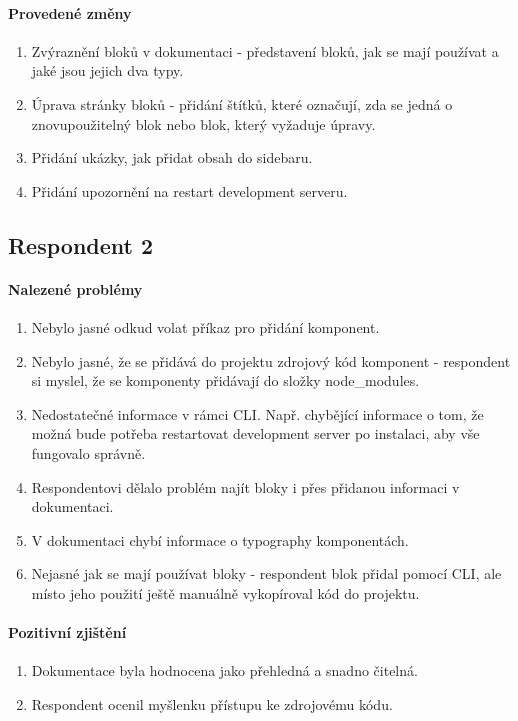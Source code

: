 \paragraph{Provedené změny}
\begin{enumerate}
  \item Zvýraznění bloků v dokumentaci - představení bloků, jak se mají používat a jaké jsou jejich dva typy.
  \item Úprava stránky bloků - přidání štítků, které označují, zda se jedná o znovupoužitelný blok nebo blok, který vyžaduje úpravy.
  \item Přidání ukázky, jak přidat obsah do sidebaru.
  \item Přidání upozornění na restart development serveru.
\end{enumerate}


\subsection{Respondent 2}

\paragraph{Nalezené problémy}
\begin{enumerate}
  \item Nebylo jasné odkud volat příkaz pro přidání komponent.
  \item Nebylo jasné, že se přidává do projektu zdrojový kód komponent - respondent si myslel, že se komponenty přidávají do složky node\_modules.
  \item Nedostatečné informace v rámci CLI. Např. chybějící informace o tom, že možná bude potřeba restartovat development server po instalaci, aby vše fungovalo správně.
  \item Respondentovi dělalo problém najít bloky i přes přidanou informaci v dokumentaci.
  \item V dokumentaci chybí informace o typography komponentách.
  \item Nejasné jak se mají používat bloky - respondent blok přidal pomocí CLI, ale místo jeho použití ještě manuálně vykopíroval kód do projektu.
\end{enumerate}

\paragraph{Pozitivní zjištění}
\begin{enumerate}
  \item Dokumentace byla hodnocena jako přehledná a snadno čitelná.
  \item Respondent ocenil myšlenku přístupu ke zdrojovému kódu.
\end{enumerate}

